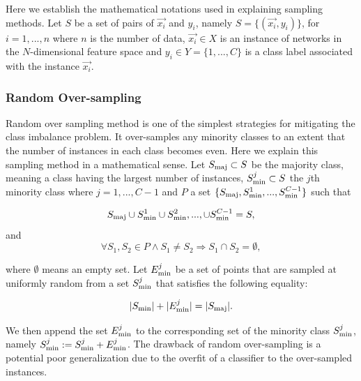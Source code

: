 \documentclass[..]{revtex4}
\begin{document}
 Here we establish the mathematical notations used in explaining sampling methods. Let $S$ be a set of pairs of $\vec{x_i}$ and $y_i$, namely $S =\{(\vec{x_i},y_i)\}$, for $i = 1,...,n$ where $n$ is the number of data, $\vec{x_i} \in X$ is an instance of networks in the $N$-dimensional feature space and $y_i \in Y = \{1,...,C\}$ is a class label associated with the instance $\vec{x_i}$.   


		\subsubsection{Random Over-sampling}
		Random over sampling method is one of the simplest strategies for mitigating the class imbalance problem. It over-samples any minority classes to an extent that the number of instances in each class becomes even. Here we explain this sampling method in a mathematical sense. Let $S_{\rm{maj}} \subset S$ be the majority class, meaning a class having the largest number of instances, $S_{\rm{min}}^{j} \subset S$ the $j$th minority class where $j = 1,...,C-1$ and $P$ a set $\{S_{\rm{maj}}, S_{\rm{min}}^{1},...,S_{\rm{min}}^{C-1} \}$ such that
	
	\begin{equation}
	S_{\rm{maj}} \cup S_{\rm{min}}^{1} \cup S_{\rm{min}}^{2},..., \cup S_{\rm{min}}^{C-1} = S,
	\end{equation}
	and
	\begin{equation}
	\forall S_1,S_2 \in P \land S_1 \neq S_2 \Rightarrow S_1 \cap S_2 = \emptyset,
	\end{equation}

	
where $\emptyset$ means an empty set. Let $E_{\rm{min}}^j$ be a set of points that are sampled at uniformly random from a set $S_{\rm{min}}^{j}$ that satisfies the following equality:

	\begin{equation}
	|S_{\rm{min}}| + | E_{\rm{min}}^j | = |S_{\rm{maj}}|.
	\end{equation}
	
 We then append the set $E_{\rm{min}}^j$ to the corresponding set of the minority class $S_{\rm{min}}^{j}$, namely $S_{\rm{min}}^{j} := S_{\rm{min}}^{j} + E_{\rm{min}}^j$. The drawback of random over-sampling is a potential poor generalization due to the overfit of a classifier to the over-sampled instances.
	
\end{document}
